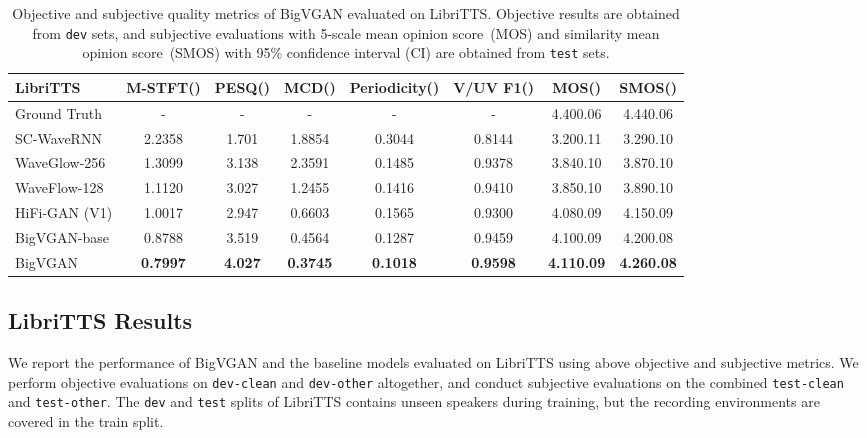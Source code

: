 \documentclass{article} \usepackage{iclr2023_conference,times}
\theoremstyle{plain}
\theoremstyle{definition}
\theoremstyle{remark}
\begin{document}
\begin{table*}[t]
\vspace{-.2cm}
\caption{\footnotesize 
Objective and subjective quality metrics of BigVGAN evaluated on LibriTTS. Objective results are obtained from \texttt{dev} sets, and subjective evaluations with 5-scale mean opinion score~(MOS) and similarity mean opinion score~(SMOS) with 95\% confidence interval (CI) are obtained from \texttt{test} sets.}
\label{tab:libritts-all}
\vspace{-0.3cm}
\begin{center}
\begin{small}
\begin{adjustbox}{width=1.01\textwidth}
\begin{tabular}{l|ccccc|cc}
\toprule
LibriTTS   & M-STFT() & PESQ() & MCD() & Periodicity() & V/UV F1() & MOS() & SMOS() \\
\midrule
Ground Truth &  - & - & - & - & - & 4.400.06 & 4.440.06 \\
\midrule
SC-WaveRNN & 2.2358 & 1.701 & 1.8854 & 0.3044 & 0.8144 & 3.200.11 & 3.290.10 \\
WaveGlow-256 & 1.3099 & 3.138 & 2.3591 & 0.1485 & 0.9378 & 3.840.10 & 3.870.10 \\
WaveFlow-128 & 1.1120 & 3.027 & 1.2455 & 0.1416 & 0.9410 & 3.850.10 & 3.890.10 \\
HiFi-GAN (V1)  & 1.0017 & 2.947 & 0.6603 & 0.1565 & 0.9300 & 4.080.09 & 4.150.09 \\
\midrule
BigVGAN-base  & 0.8788 & 3.519 & 0.4564 & 0.1287 & 0.9459 & 4.100.09 & 4.200.08 \\
BigVGAN     & \textbf{0.7997} & \textbf{4.027} & \textbf{0.3745} & \textbf{0.1018} & \textbf{0.9598} & \textbf{4.110.09} & \textbf{4.260.08} \\
\bottomrule
\end{tabular}
\end{adjustbox}
\end{small}
\end{center}
\vskip -0.15in
\end{table*}


\vspace{-.2cm}
\subsection{LibriTTS Results}
\label{libritts-result}
\vspace{-.1cm}
We report the performance of BigVGAN and the baseline models evaluated on LibriTTS using above objective and subjective metrics.
We perform objective evaluations on \texttt{dev-clean} and \texttt{dev-other} altogether, and conduct subjective evaluations on the combined \texttt{test-clean} and \texttt{test-other}. The \texttt{dev} and \texttt{test} splits of LibriTTS contains unseen speakers during training, but the recording environments are covered in the train split.
\end{document}
